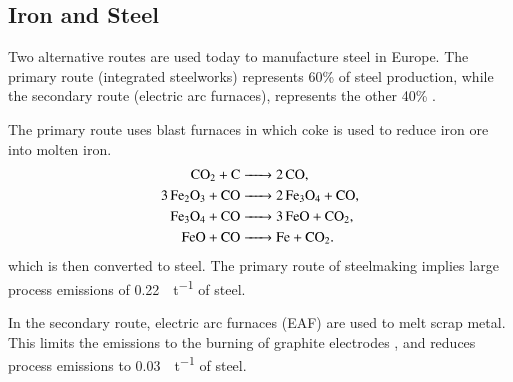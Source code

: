 



\subsection{Iron and Steel}
\label{sec:si:industry:steel}

Two alternative routes are used today to manufacture steel in Europe. The
primary route (integrated steelworks) represents 60\% of steel production, while
the secondary route (electric arc furnaces), represents the other 40\%
.

The primary route uses blast furnaces in which coke is used to reduce iron ore
into molten iron.
\begin{align}
    \ce{CO2 + C &-> 2CO}, \\
    \ce{3Fe2O3 + CO &-> 2Fe3O4 + CO}, \\
    \ce{Fe3O4 + CO &-> 3FeO + CO2}, \\
    \ce{FeO + CO &-> Fe + CO2}.
\end{align}
which is then converted to steel. The primary route of steelmaking implies large
process emissions of \SI{0.22}{\tco\per\tonne} of steel.

In the secondary route, electric arc furnaces (EAF) are used to melt scrap
metal. This limits the \co emissions to the burning of graphite electrodes
, and reduces process emissions to
\SI{0.03}{\tco\per\tonne} of steel.

